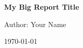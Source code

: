 \begin{titlepage}
    \centering
    \vspace*{3cm}
    {\Huge\bfseries My Big Report Title \par}
    \vspace{2cm}
    {\Large Author: Your Name \par}
    \vfill
    {\large \today\par}
\end{titlepage}
